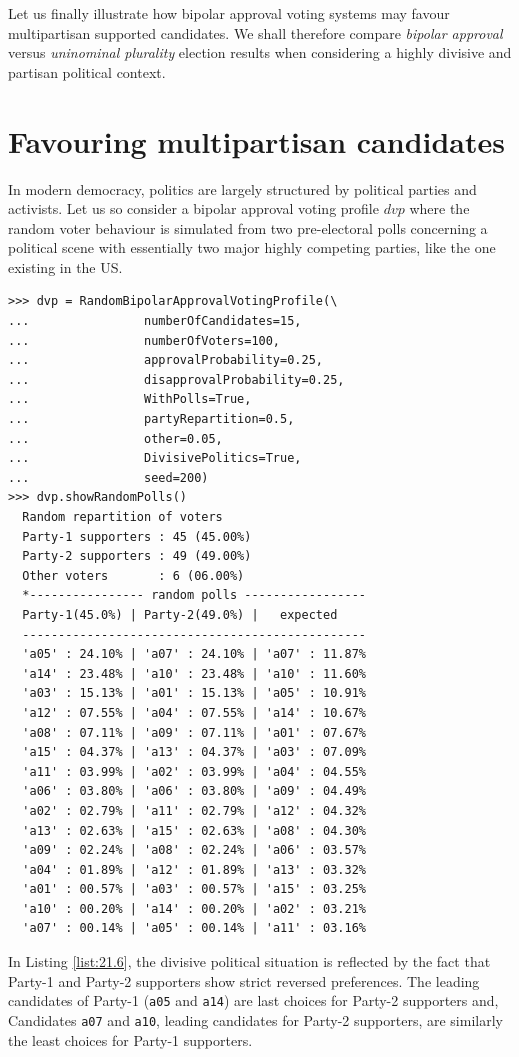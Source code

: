 Let us finally illustrate how bipolar approval voting systems may favour multipartisan supported candidates. We shall therefore compare \emph{bipolar approval} versus \emph{uninominal plurality} election results when considering a highly divisive and partisan political context.
 
\section{Favouring multipartisan candidates}
\label{sec:21.3}

In modern democracy, politics  are largely structured by political parties and activists. Let us so consider a bipolar approval voting profile $dvp$ where the random voter behaviour is simulated from two pre-electoral polls concerning a political scene with essentially two major highly competing parties, like the one existing in the US.
\begin{lstlisting}[caption={A random bipolar approval voting profile in a divisive political context},label=list:21.6]
>>> dvp = RandomBipolarApprovalVotingProfile(\
...                numberOfCandidates=15,
...                numberOfVoters=100,
...                approvalProbability=0.25,
...                disapprovalProbability=0.25,
...                WithPolls=True,
...                partyRepartition=0.5,
...                other=0.05,
...                DivisivePolitics=True,
...                seed=200)
>>> dvp.showRandomPolls()
  Random repartition of voters
  Party-1 supporters : 45 (45.00%)
  Party-2 supporters : 49 (49.00%)
  Other voters       : 6 (06.00%)
  *---------------- random polls -----------------
  Party-1(45.0%) | Party-2(49.0%) |   expected  
  ------------------------------------------------
  'a05' : 24.10% | 'a07' : 24.10% | 'a07' : 11.87%
  'a14' : 23.48% | 'a10' : 23.48% | 'a10' : 11.60%
  'a03' : 15.13% | 'a01' : 15.13% | 'a05' : 10.91%
  'a12' : 07.55% | 'a04' : 07.55% | 'a14' : 10.67%
  'a08' : 07.11% | 'a09' : 07.11% | 'a01' : 07.67%
  'a15' : 04.37% | 'a13' : 04.37% | 'a03' : 07.09%
  'a11' : 03.99% | 'a02' : 03.99% | 'a04' : 04.55%
  'a06' : 03.80% | 'a06' : 03.80% | 'a09' : 04.49%
  'a02' : 02.79% | 'a11' : 02.79% | 'a12' : 04.32%
  'a13' : 02.63% | 'a15' : 02.63% | 'a08' : 04.30%
  'a09' : 02.24% | 'a08' : 02.24% | 'a06' : 03.57%
  'a04' : 01.89% | 'a12' : 01.89% | 'a13' : 03.32%
  'a01' : 00.57% | 'a03' : 00.57% | 'a15' : 03.25%
  'a10' : 00.20% | 'a14' : 00.20% | 'a02' : 03.21%
  'a07' : 00.14% | 'a05' : 00.14% | 'a11' : 03.16%
\end{lstlisting}   
In Listing \ref{list:21.6}, the divisive political situation is reflected by the fact that Party-1 and Party-2 supporters show strict reversed preferences. The leading candidates of Party-1 (\texttt{a05} and \texttt{a14}) are last choices for Party-2 supporters and, Candidates \texttt{a07} and \texttt{a10}, leading candidates for Party-2 supporters, are similarly the least choices for Party-1 supporters.

